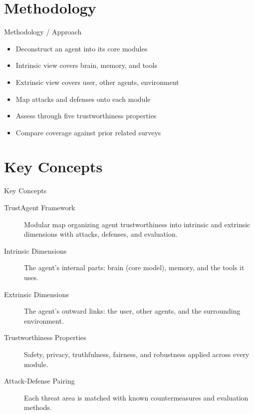 \documentclass[10pt]{beamer}
\begin{document}
\section{Methodology}
\begin{frame}[allowframebreaks]{Methodology / Approach}
\begin{itemize}
  \item Deconstruct an agent into its core modules
  \item Intrinsic view covers brain, memory, and tools
  \item Extrinsic view covers user, other agents, environment
  \item Map attacks and defenses onto each module
  \item Assess through five trustworthiness properties
  \item Compare coverage against prior related surveys
\end{itemize}
\end{frame}

\section{Key Concepts}
\begin{frame}[allowframebreaks]{Key Concepts}
  \begin{description}
    \item[TrustAgent Framework] Modular map organizing agent trustworthiness into intrinsic and extrinsic dimensions with attacks, defenses, and evaluation.
    \item[Intrinsic Dimensions] The agent's internal parts: brain (core model), memory, and the tools it uses.
    \item[Extrinsic Dimensions] The agent's outward links: the user, other agents, and the surrounding environment.
    \item[Trustworthiness Properties] Safety, privacy, truthfulness, fairness, and robustness applied across every module.
    \item[Attack-Defense Pairing] Each threat area is matched with known countermeasures and evaluation methods.
  \end{description}
\end{frame}
\end{document}
